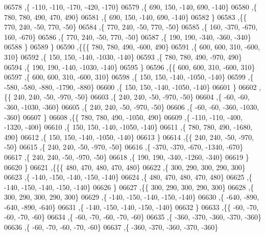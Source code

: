 \begin{DoxyCode}
06578     ,\{  -110,  -110,  -170,  -420,  -170\}
06579     ,\{   690,   150,  -140,   690,  -140\}
06580     ,\{   780,   780,   490,   470,   490\}
06581     ,\{   690,   150,  -140,   690,  -140\}
06582     \}
06583    ,\{\{   770,   240,   -50,   770,   -50\}
06584     ,\{   770,   240,   -50,   770,   -50\}
06585     ,\{   160,  -370,  -670,   160,  -670\}
06586     ,\{   770,   240,   -50,   770,   -50\}
06587     ,\{   190,   190,  -340,  -360,  -340\}
06588     \}
06589    \}
06590   ,\{\{\{   780,   780,   490,  -600,   490\}
06591     ,\{   600,   600,   310,  -600,   310\}
06592     ,\{   150,   150,  -140, -1030,  -140\}
06593     ,\{   780,   780,   490,  -970,   490\}
06594     ,\{   190,   190,  -140, -1030,  -140\}
06595     \}
06596    ,\{\{   600,   600,   310,  -600,   310\}
06597     ,\{   600,   600,   310,  -600,   310\}
06598     ,\{   150,   150,  -140, -1050,  -140\}
06599     ,\{  -580,  -580,  -880, -1790,  -880\}
06600     ,\{   150,   150,  -140, -1050,  -140\}
06601     \}
06602    ,\{\{   240,   240,   -50,  -970,   -50\}
06603     ,\{   240,   240,   -50,  -970,   -50\}
06604     ,\{   -60,   -60,  -360, -1030,  -360\}
06605     ,\{   240,   240,   -50,  -970,   -50\}
06606     ,\{   -60,   -60,  -360, -1030,  -360\}
06607     \}
06608    ,\{\{   780,   780,   490, -1050,   490\}
06609     ,\{  -110,  -110,  -400, -1320,  -400\}
06610     ,\{   150,   150,  -140, -1050,  -140\}
06611     ,\{   780,   780,   490, -1680,   490\}
06612     ,\{   150,   150,  -140, -1050,  -140\}
06613     \}
06614    ,\{\{   240,   240,   -50,  -970,   -50\}
06615     ,\{   240,   240,   -50,  -970,   -50\}
06616     ,\{  -370,  -370,  -670, -1340,  -670\}
06617     ,\{   240,   240,   -50,  -970,   -50\}
06618     ,\{   190,   190,  -340, -1260,  -340\}
06619     \}
06620    \}
06621   ,\{\{\{   480,   470,   480,   470,   480\}
06622     ,\{   300,   290,   300,   290,   300\}
06623     ,\{  -140,  -150,  -140,  -150,  -140\}
06624     ,\{   480,   470,   480,   470,   480\}
06625     ,\{  -140,  -150,  -140,  -150,  -140\}
06626     \}
06627    ,\{\{   300,   290,   300,   290,   300\}
06628     ,\{   300,   290,   300,   290,   300\}
06629     ,\{  -140,  -150,  -140,  -150,  -140\}
06630     ,\{  -640,  -890,  -640,  -890,  -640\}
06631     ,\{  -140,  -150,  -140,  -150,  -140\}
06632     \}
06633    ,\{\{   -60,   -70,   -60,   -70,   -60\}
06634     ,\{   -60,   -70,   -60,   -70,   -60\}
06635     ,\{  -360,  -370,  -360,  -370,  -360\}
06636     ,\{   -60,   -70,   -60,   -70,   -60\}
06637     ,\{  -360,  -370,  -360,  -370,  -360\}

\end{DoxyCode}
